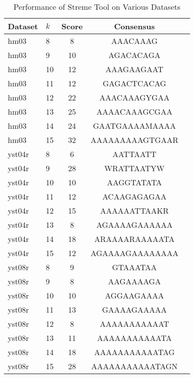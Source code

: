 \documentclass{report}
\begin{document}
\begin{table}[htbp]
\centering
\caption{Performance of Streme Tool on Various Datasets}
\begin{tabular}{@{}llccc@{}}
\toprule
\textbf{Dataset} & \textbf{\(k\)} & \textbf{Score} & \textbf{Consensus} \\ \midrule
hm03 & 8 & 8 & AAACAAAG \\
hm03 & 9 & 10 & AGACACAGA \\
hm03 & 10 & 12 & AAAGAAGAAT \\
hm03 & 11 & 12 & GAGACTCACAG \\
hm03 & 12 & 22 & AAACAAAGYGAA \\
hm03 & 13 & 25 & AAAACAAAGCGAA \\
hm03 & 14 & 24 & GAATGAAAAMAAAA \\
hm03 & 15 & 32 & AAAAAAAAAGTGAAR \\
yst04r & 8 & 6 & AATTAATT \\
yst04r & 9 & 28 & WRATTAATYW \\
yst04r & 10 & 10 & AAGGTATATA \\
yst04r & 11 & 12 & ACAAGAGAGAA \\
yst04r & 12 & 15 & AAAAAATTAAKR \\
yst04r & 13 & 8 & AGAAAAGAAAAAA \\
yst04r & 14 & 18 & ARAAAARAAAAATA \\
yst04r & 15 & 12 & AGAAAAGAAAAAAAA \\
yst08r & 8 & 9 & GTAAATAA \\
yst08r & 9 & 8 & AAGAAAAGA \\
yst08r & 10 & 10 & AGGAAGAAAA \\
yst08r & 11 & 13 & GAAAAGAAAAA \\
yst08r & 12 & 8 & AAAAAAAAAAAT \\
yst08r & 13 & 11 & AAAAAAAAAAATA \\
yst08r & 14 & 18 & AAAAAAAAAAATAG \\
yst08r & 15 & 28 & AAAAAAAAAAATAGN \\ \bottomrule
\end{tabular}
\end{table}
\end{document}
